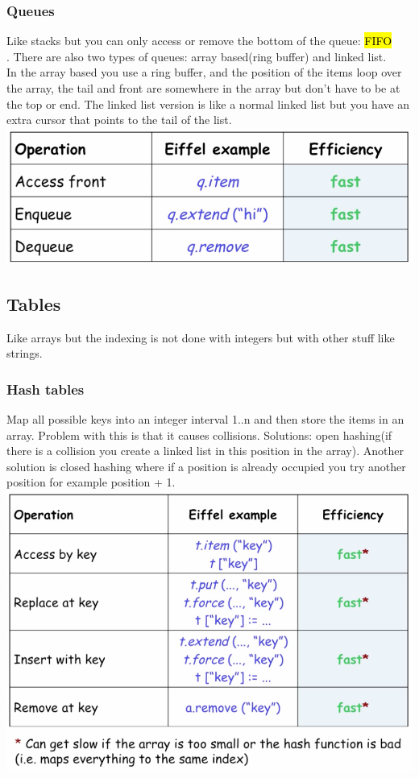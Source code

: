 \documentclass[11pt]{article}
\newcommand\back[1][-3cm]{\hspace*{#1}}
\begin{document}
\subsubsection{Queues}
Like stacks but you can only access or remove the bottom of the queue: \hl{FIFO\\}. There are also two types of queues: array based(ring buffer) and linked list.\\In the array based you use a ring buffer, and the position of the items loop over the array, the tail and front are somewhere in the array but don't have to be at the top or end. The linked list version is like a normal linked list but you have an extra cursor that points to the tail of the list.\\
\back\includegraphics{queue}
\subsection{Tables}
Like arrays but the indexing is not done with integers but with other stuff like strings.
\subsubsection{Hash tables}
Map all possible keys into an integer interval 1..n and then store the items in an array. Problem with this is that it causes collisions. Solutions: open hashing(if there is a collision you create a linked list in this position in the array). Another solution is closed hashing where if a position is already occupied you try another position for example position + 1.\\
\back\includegraphics{table}
\end{document}

